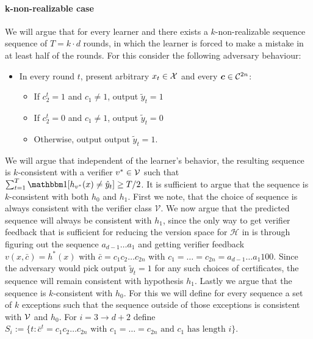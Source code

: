 \documentclass[anon]{alt2027} %
\begin{document}
\paragraph{k-non-realizable case} We will argue that for every learner and there exists a $k$-non-realizable sequence sequence of $T= k\cdot d$ rounds, in which the learner is forced to make a mistake in at least half of the rounds. 
For this consider the following adversary behaviour: 
\begin{itemize}
    \item In every round $t$, present arbitrary $x_t \in {\mathcal X}$ and every $\bm{c} \in {{\mathcal C}}^{2n}$: 
    \begin{itemize}
        \item If $c_2^t = 1$ and $c_1 \neq 1$, output $\tilde{y}_{t} = 1$
        \item If $c_2^t = 0$ and $c_1 \neq 1$, output $\tilde{y}_{t} = 0$
        \item Otherwise, output output $\tilde{y}_{t} = 1$.
    \end{itemize}
\end{itemize}
We will argue that independent of the learner's behavior, the resulting sequence is $k$-consistent with a verifier $v^* \in {\mathcal V}$ such that $\sum_{t=1}^T \indct[h_{v^*}(x) \neq \hat{y}_t] \geq T/2$. 
It is sufficient to argue that the sequence is $k$-consistent with both $h_0$ and $h_1$.
First we note, that the choice of sequence is always consistent with the verifier class $\mathcal{V}$.
We now argue that the predicted sequence will always be consistent with $h_1$, since the only way to get verifier feedback that is sufficient for reducing the version space for $\mathcal{H}$ in  is through figuring out the sequence $a_{d-1} \dots a_1$ and getting verifier feedback $v(x, \bar{c}) = h^* (x) $ with $\bar{c} = c_1c_2 \dots c_{2n}$ with $c_1 = \dots = c_{2n} = a_{d-1} \dots a_1 1 0 0$. Since the adversary would pick output $\tilde{y}_t =1$ for any such choices of certificates, the sequence will remain consistent with hypothesis $h_1$.
Lastly we argue that the sequence is $k$-consistent with $h_0$.
For this we will define for every sequence a set of $k$ exceptions such that the sequence outside of those exceptions is consistent with ${\mathcal V}$ and $h_0$.
For $i = 3 \to d+2$ define $S_i := \{t : \bar{c}^t = c_1c_2 \dots c_{2n} \text{ with } c_1 = \dots = c_{2n} \text{ and } c_1 \text{ has length }i\}$.
\end{document}
